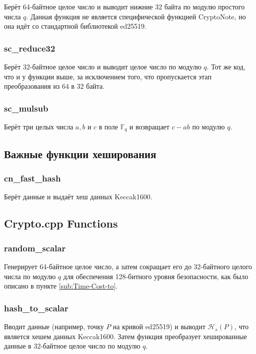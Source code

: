 \documentclass{mrl}
\numberwithin{equation}{section}
\numberwithin{figure}{section}
\begin{document}
Берёт 64-байтное целое число и выводит нижние 32 байта по модулю простого числа $q$. Данная функция не является специфической функцией CryptoNote, но она идёт со стандартной библиотекой ed25519.


\subsubsection{sc\_reduce32}

Берёт 32-байтное целое число и выводит целое число по модулю $q$. Тот же код, что и у функции выше, за исключением того, что пропускается этап преобразования из $64$ в $32$ байта.

\subsubsection{sc\_mulsub}

Берёт три целых числа $a,b$ и $c$ в поле $\mathbb{F}_{q}$ и возвращает $c-ab$ по модулю $q$.


\subsection{Важные функции хеширования}


\subsubsection{cn\_fast\_hash}

Берёт данные и выдаёт хеш данных Keccak1600.


\subsection{Crypto.cpp Functions }


\subsubsection{random\_scalar}

Генерирует 64-байтное целое число, а затем сокращает его до 32-байтного целого числа по модулю $q$ для обеспечения 128-битного уровня безопасности, как было описано в пункте \ref{sub:Time-Cost-to}.

\subsubsection{hash\_to\_scalar}

Вводит данные (например, точку $P$ на кривой ed25519) и выводит $\mathcal{H}_{s}\left(P\right)$, что является хешем данных Keccak1600. Затем функция преобразует хешированные данные в 32-байтное целое число по модулю $q$.
\end{document}
